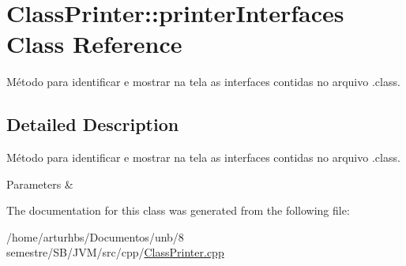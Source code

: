 \hypertarget{classClassPrinter_1_1printerInterfaces}{}\section{Class\+Printer\+:\+:printer\+Interfaces Class Reference}
\label{classClassPrinter_1_1printerInterfaces}


Método para identificar e mostrar na tela as interfaces contidas no arquivo .class.  




\subsection{Detailed Description}
Método para identificar e mostrar na tela as interfaces contidas no arquivo .class. 


\begin{DoxyParams}{Parameters}
{\em } & \\
\hline
\end{DoxyParams}


The documentation for this class was generated from the following file\+:\begin{DoxyCompactItemize}
\item 
/home/arturhbs/\+Documentos/unb/8 semestre/\+S\+B/\+J\+V\+M/src/cpp/\hyperlink{ClassPrinter_8cpp}{Class\+Printer.\+cpp}\end{DoxyCompactItemize}
